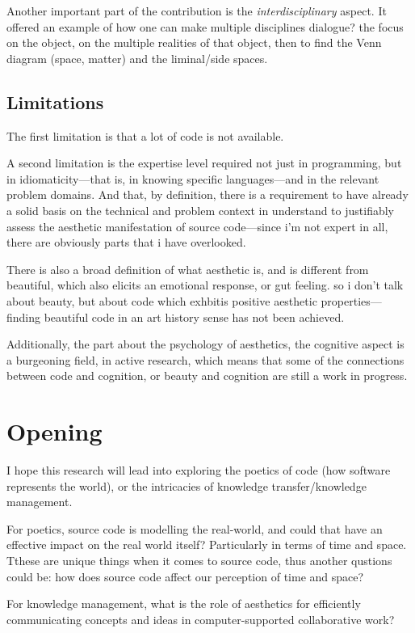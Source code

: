 Another important part of the contribution is the \emph{interdisciplinary} aspect. It offered an example of how one can make multiple disciplines dialogue? the focus on the object, on the multiple realities of that object, then to find the Venn diagram (space, matter) and the liminal/side spaces.



\subsection{Limitations} %

The first limitation is that a lot of code is not available.

A second limitation is the expertise level required not just in programming, but in idiomaticity—that is, in knowing specific languages—and in the relevant problem domains. And that, by definition, there is a requirement to have already a solid basis on the technical and problem context in understand to justifiably assess the aesthetic manifestation of source code—since i'm not expert in all, there are obviously parts that i have overlooked.

There is also a broad definition of what aesthetic is, and is different from beautiful, which also elicits an emotional response, or gut feeling. so i don't talk about beauty, but about code which exhbitis positive aesthetic properties—finding beautiful code in an art history sense has not been achieved.

Additionally, the part about the psychology of aesthetics, the cognitive aspect is a burgeoning field, in active research, which means that some of the connections between code and cognition, or beauty and cognition are still a work in progress.


\section{Opening} %

I hope this research will lead into exploring the poetics of code (how software represents the world), or the intricacies of knowledge transfer/knowledge management.

For poetics, source code is modelling the real-world, and could that have an effective impact on the real world itself? Particularly in terms of  time and space. Tthese are unique things when it comes to source code, thus another qustions could be: how does source code affect our perception of time and space?

For knowledge management, what is the role of aesthetics for efficiently communicating concepts and ideas in computer-supported collaborative work?